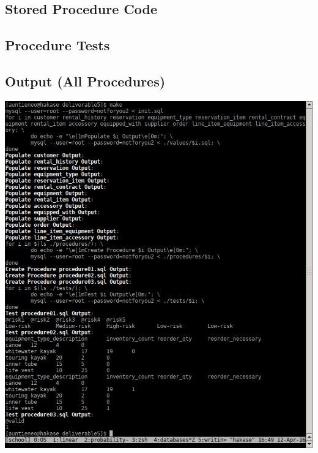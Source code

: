 \documentclass[12pt]{article}
\begin{document}
\subsection{Stored Procedure Code}




\subsection{Procedure Tests}




\subsection{Output (All Procedures)}
\includegraphics[scale=0.60]{./screenshots/deliverable5output.png}
\end{document}
